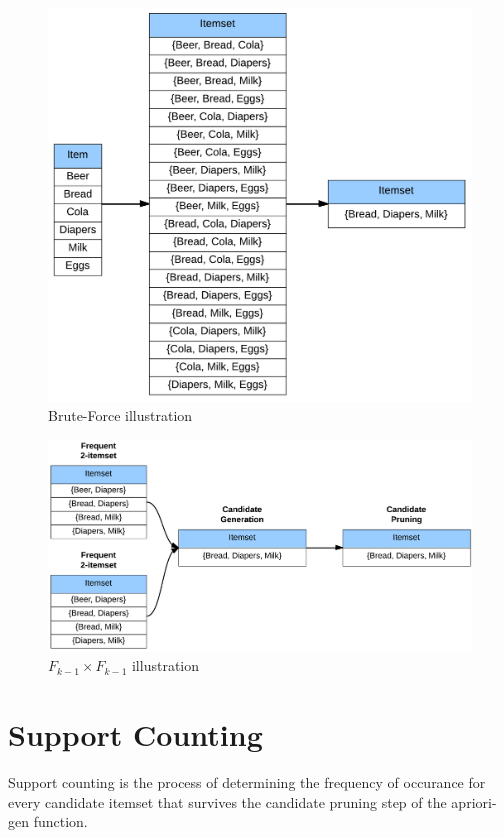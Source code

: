 				\begin{figure}[H]
					\centering
					\includegraphics[scale=0.2]{pics/apriori1.png}
					\caption{Brute-Force illustration}
				\end{figure}

				\begin{figure}[H]
					\centering
					\includegraphics[width=\textwidth]{pics/apriori3.png}
					\caption{$F_{k-1} \times F_{k-1}$ illustration}
				\end{figure}

	\clearpage
	\section{Support Counting}

	Support counting is the process of determining the frequency of occurance for every candidate itemset
	that survives the candidate pruning step of the apriori-gen function. 

